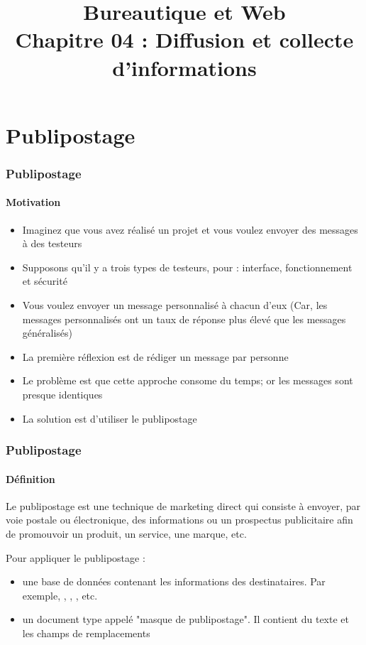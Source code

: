 \documentclass[xcolor=table]{beamer}
\title[BWEB: 03- Diffusion et collecte] %
{Bureautique et Web \\Chapitre 04 : Diffusion et collecte d'informations}
\begin{document}
%
%

\section{Publipostage}

\begin{frame}
\frametitle{Publipostage}
\framesubtitle{Motivation}

\begin{itemize}
	\item Imaginez que vous avez réalisé un projet et vous voulez envoyer des messages à des testeurs
	\item Supposons qu'il y a trois types de testeurs, pour : interface, fonctionnement et sécurité 
	\item Vous voulez envoyer un message personnalisé à chacun d'eux (Car, les messages personnalisés ont un taux de réponse plus élevé que les messages généralisés) 
	\item La première réflexion est de rédiger un message par personne 
	\item Le problème est que cette approche consome du temps; or les messages sont presque identiques
	\item La solution est d'utiliser le publipostage
\end{itemize}

\end{frame}

\begin{frame}
\frametitle{Publipostage}
\framesubtitle{Définition}

\begin{definition}
	Le publipostage est une technique de marketing direct qui consiste à envoyer, par voie postale ou électronique, des informations ou un prospectus publicitaire afin de promouvoir un produit, un service, une marque, etc.
\end{definition}

Pour appliquer le publipostage : 
\begin{itemize}
	\item une base de données contenant les informations des destinataires. Par exemple, , , , etc.
	\item un document type appelé "masque de publipostage". Il contient du texte et les champs de remplacements	
\end{itemize}

\end{frame}
\end{document}
